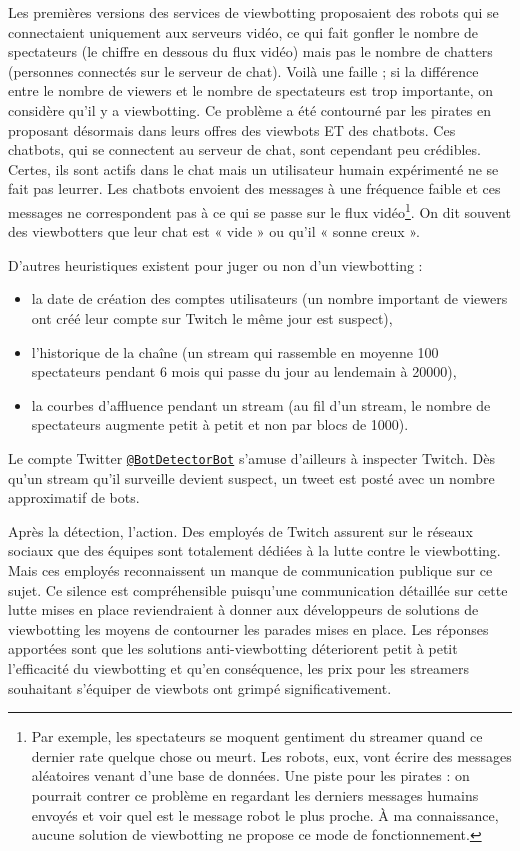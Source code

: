 \documentclass[a4paper]{article}
\begin{document}
Les premières versions des services de viewbotting proposaient des robots qui se connectaient uniquement aux serveurs vidéo, ce qui fait gonfler le nombre de spectateurs (le chiffre en dessous du flux vidéo) mais pas le nombre de chatters (personnes connectés sur le serveur de chat). Voilà une faille ; si la différence entre le nombre de viewers et le nombre de spectateurs est trop importante, on considère qu'il y a viewbotting. Ce problème a été contourné par les pirates en proposant désormais dans leurs offres des viewbots ET des chatbots. Ces chatbots, qui se connectent au serveur de chat, sont cependant peu crédibles. Certes, ils sont actifs dans le chat mais un utilisateur humain expérimenté ne se fait pas leurrer. Les chatbots envoient des messages à une fréquence faible et ces messages ne correspondent pas à ce qui se passe sur le flux vidéo\footnote{Par exemple, les spectateurs se moquent gentiment du streamer quand ce dernier rate quelque chose ou meurt. Les robots, eux, vont écrire des messages aléatoires venant d'une base de données. Une piste pour les pirates : on pourrait contrer ce problème en regardant les derniers messages humains envoyés et voir quel est le message robot le plus proche. À ma connaissance, aucune solution de viewbotting ne propose ce mode de fonctionnement.}. On dit souvent des viewbotters que leur chat est « vide » ou qu'il « sonne creux ».

D'autres heuristiques existent pour juger ou non d'un viewbotting :
\begin{itemize}
\item la date de création des comptes utilisateurs (un nombre important de viewers ont créé leur compte sur Twitch le même jour est suspect),
\item l'historique de la chaîne (un stream qui rassemble en moyenne 100 spectateurs pendant 6 mois qui passe du jour au lendemain à 20000),
\item la courbes d'affluence pendant un stream (au fil d'un stream, le nombre de spectateurs augmente petit à petit et non par blocs de 1000).
\end{itemize}
Le compte Twitter \href{https://twitter.com/botdetectorbot}{\texttt{@BotDetectorBot}} s'amuse d'ailleurs à inspecter Twitch. Dès qu'un stream qu'il surveille devient suspect, un tweet est posté avec un nombre approximatif de bots.

Après la détection, l'action. Des employés de Twitch assurent sur le réseaux sociaux que des équipes sont totalement dédiées à la lutte contre le viewbotting. Mais ces employés reconnaissent un manque de communication publique sur ce sujet. Ce silence est compréhensible puisqu'une communication détaillée sur cette lutte mises en place reviendraient à donner aux développeurs de solutions de viewbotting les moyens de contourner les parades mises en place. Les réponses apportées sont que les solutions anti-viewbotting déteriorent petit à petit l'efficacité du viewbotting et qu'en conséquence, les prix pour les streamers souhaitant s'équiper de viewbots ont grimpé significativement\cite{RedditJan2015}. 
\end{document}
